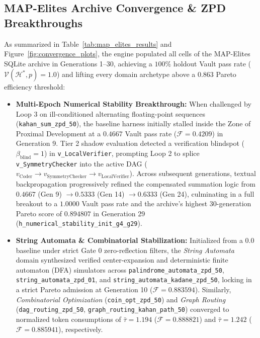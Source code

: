\documentclass[10pt,twocolumn,letterpaper]{article}
\begin{document}
\subsection{MAP-Elites Archive Convergence \& ZPD Breakthroughs}
As summarized in Table~\ref{tab:map_elites_results} and Figure~\ref{fig:convergence_plots}, the engine populated all cells of the MAP-Elites SQLite archive in Generations 1--30, achieving a $100\%$ holdout Vault pass rate ($\mathcal{V}(\mathcal{H}^{*},p)=1.0$) and lifting every domain archetype above a $0.863$ Pareto efficiency threshold:
\begin{itemize}
    \item \textbf{Multi-Epoch Numerical Stability Breakthrough:} When challenged by Loop 3 on ill-conditioned alternating floating-point sequences (\texttt{kahan\_\allowbreak sum\_\allowbreak zpd\_50}), the baseline harness initially stalled inside the Zone of Proximal Development at a $0.4667$ Vault pass rate ($\mathcal{F}=0.4209$) in Generation 9. Tier 2 shadow evaluation detected a verification blindspot ($\beta_{\text{blind}}=1$) in \texttt{v\_LocalVerifier}, prompting Loop 2 to splice \texttt{v\_SymmetryChecker} into the active DAG ($v_{\text{Coder}}\to v_{\text{SymmetryChecker}}\to v_{\text{LocalVerifier}}$). Across subsequent generations, textual backpropagation progressively refined the compensated summation logic from $0.4667$ (Gen 9) $\to 0.5333$ (Gen 14) $\to 0.6333$ (Gen 24), culminating in a full breakout to a $1.0000$ Vault pass rate and the archive's highest 30-generation Pareto score of $0.894807$ in Generation 29 (\texttt{h\_numerical\_\allowbreak stability\_\allowbreak init\_g4\_g29}).
    \item \textbf{String Automata \& Combinatorial Stabilization:} Initialized from a $0.0$ baseline under strict Gate 0 zero-reflection filters, the \textit{String Automata} domain synthesized verified center-expansion and deterministic finite automaton (DFA) simulators across \texttt{palindrome\_\allowbreak automata\_\allowbreak zpd\_50}, \texttt{string\_\allowbreak automata\_\allowbreak zpd\_01}, and \texttt{string\_\allowbreak automata\_\allowbreak kadane\_\allowbreak zpd\_50}, locking in a strict Pareto admission at Generation 10 ($\mathcal{F}=0.883594$). Similarly, \textit{Combinatorial Optimization} (\texttt{coin\_\allowbreak opt\_\allowbreak zpd\_50}) and \textit{Graph Routing} (\texttt{dag\_\allowbreak routing\_\allowbreak zpd\_50}, \texttt{graph\_\allowbreak routing\_\allowbreak kahan\_\allowbreak path\_50}) converged to normalized token consumptions of $\bar{\tau}=1.194$ ($\mathcal{F}=0.888821$) and $\bar{\tau}=1.242$ ($\mathcal{F}=0.885941$), respectively.
\end{itemize}
\end{document}
